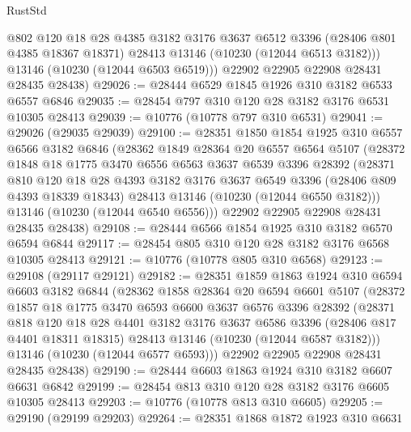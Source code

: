 \begin{lexlean}{RustStd}
\begin{coremodule}
          @802
          @120
          @18
          @28
          @4385
          @3182
          @3176
          @3637
          @6512
          @3396
          (@28406 @801 @4385 @18367 @18371)
          @28413
          @13146
          (@10230 (@12044 @6513 @3182)))
        @13146
        (@10230 (@12044 @6503 @6519)))
      @22902
      @22905
      @22908
      @28431
      @28435
      @28438)
@29026 := @28444 @6529 @1845 @1926 @310 @3182 @6533 @6557 @6846
@29035 := @28454 @797 @310 @120 @28 @3182 @3176 @6531 @10305 @28413
@29039 := @10776 (@10778 @797 @310 @6531)
@29041 := @29026 (@29035 @29039)
@29100 := @28351
    @1850
    @1854
    @1925
    @310
    @6557
    @6566
    @3182
    @6846
    (@28362
      @1849
      @28364
      @20
      @6557
      @6564
      @5107
      (@28372
        @1848
        @18
        @1775
        @3470
        @6556
        @6563
        @3637
        @6539
        @3396
        @28392
        (@28371
          @810
          @120
          @18
          @28
          @4393
          @3182
          @3176
          @3637
          @6549
          @3396
          (@28406 @809 @4393 @18339 @18343)
          @28413
          @13146
          (@10230 (@12044 @6550 @3182)))
        @13146
        (@10230 (@12044 @6540 @6556)))
      @22902
      @22905
      @22908
      @28431
      @28435
      @28438)
@29108 := @28444 @6566 @1854 @1925 @310 @3182 @6570 @6594 @6844
@29117 := @28454 @805 @310 @120 @28 @3182 @3176 @6568 @10305 @28413
@29121 := @10776 (@10778 @805 @310 @6568)
@29123 := @29108 (@29117 @29121)
@29182 := @28351
    @1859
    @1863
    @1924
    @310
    @6594
    @6603
    @3182
    @6844
    (@28362
      @1858
      @28364
      @20
      @6594
      @6601
      @5107
      (@28372
        @1857
        @18
        @1775
        @3470
        @6593
        @6600
        @3637
        @6576
        @3396
        @28392
        (@28371
          @818
          @120
          @18
          @28
          @4401
          @3182
          @3176
          @3637
          @6586
          @3396
          (@28406 @817 @4401 @18311 @18315)
          @28413
          @13146
          (@10230 (@12044 @6587 @3182)))
        @13146
        (@10230 (@12044 @6577 @6593)))
      @22902
      @22905
      @22908
      @28431
      @28435
      @28438)
@29190 := @28444 @6603 @1863 @1924 @310 @3182 @6607 @6631 @6842
@29199 := @28454 @813 @310 @120 @28 @3182 @3176 @6605 @10305 @28413
@29203 := @10776 (@10778 @813 @310 @6605)
@29205 := @29190 (@29199 @29203)
@29264 := @28351
    @1868
    @1872
    @1923
    @310
    @6631

\end{coremodule}
\end{lexlean}
